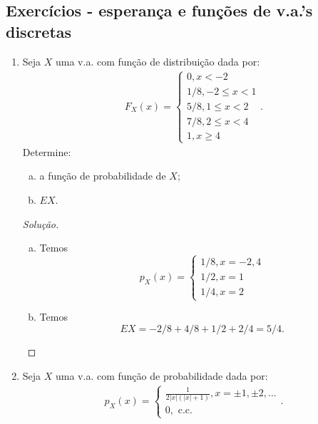 \documentclass[../Notas.tex]{subfiles}
\begin{document}
\subsection{Exercícios - esperança e funções de v.a.'s discretas}

\begin{enumerate}
    \item Seja $X$ uma v.a. com função de distribuição dada por:
    \begin{align*}
        F_X(x) = \begin{cases}
            0, x < -2 \\
            1/8, -2\leq x < 1 \\
            5/8, 1\leq x < 2 \\
            7/8, 2\leq x < 4 \\
            1, x\geq 4
        \end{cases}.
    \end{align*}
    Determine:
    \begin{enumerate}[a)]
        \item a função de probabilidade de $X$;
        \item $EX$.
    \end{enumerate}
    \begin{proof}[Solução]
        \begin{enumerate}[a)]
            \item Temos
            \[
            p_X(x) = \begin{cases}
            1/8, x=-2,4 \\
            1/2, x=1 \\
            1/4, x=2
            \end{cases}
            \]
            \item Temos
            \[
            EX = -2/8 + 4/8 + 1/2 + 2/4 = 5/4.
            \]
        \end{enumerate}   
    \end{proof}
    \item Seja $X$ uma v.a. com função de probabilidade dada por:
    \begin{align*}
        p_X(x) = \begin{cases}
        \frac{1}{2|x|(|x|+1)}, x = \pm 1, \pm 2, \dots \\
        0, \text{ c.c.}
        \end{cases}.
    \end{align*}

\end{enumerate}
\end{document}
